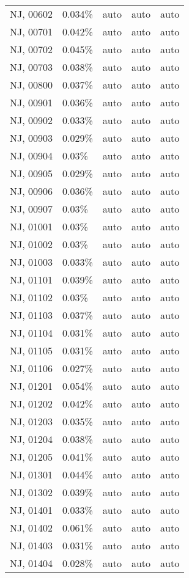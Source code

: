 \begin{longtable}[]{@{}lllll@{}}
NJ, 00602 & 0.034\% & auto & auto & auto \\
NJ, 00701 & 0.042\% & auto & auto & auto \\
NJ, 00702 & 0.045\% & auto & auto & auto \\
NJ, 00703 & 0.038\% & auto & auto & auto \\
NJ, 00800 & 0.037\% & auto & auto & auto \\
NJ, 00901 & 0.036\% & auto & auto & auto \\
NJ, 00902 & 0.033\% & auto & auto & auto \\
NJ, 00903 & 0.029\% & auto & auto & auto \\
NJ, 00904 & 0.03\% & auto & auto & auto \\
NJ, 00905 & 0.029\% & auto & auto & auto \\
NJ, 00906 & 0.036\% & auto & auto & auto \\
NJ, 00907 & 0.03\% & auto & auto & auto \\
NJ, 01001 & 0.03\% & auto & auto & auto \\
NJ, 01002 & 0.03\% & auto & auto & auto \\
NJ, 01003 & 0.033\% & auto & auto & auto \\
NJ, 01101 & 0.039\% & auto & auto & auto \\
NJ, 01102 & 0.03\% & auto & auto & auto \\
NJ, 01103 & 0.037\% & auto & auto & auto \\
NJ, 01104 & 0.031\% & auto & auto & auto \\
NJ, 01105 & 0.031\% & auto & auto & auto \\
NJ, 01106 & 0.027\% & auto & auto & auto \\
NJ, 01201 & 0.054\% & auto & auto & auto \\
NJ, 01202 & 0.042\% & auto & auto & auto \\
NJ, 01203 & 0.035\% & auto & auto & auto \\
NJ, 01204 & 0.038\% & auto & auto & auto \\
NJ, 01205 & 0.041\% & auto & auto & auto \\
NJ, 01301 & 0.044\% & auto & auto & auto \\
NJ, 01302 & 0.039\% & auto & auto & auto \\
NJ, 01401 & 0.033\% & auto & auto & auto \\
NJ, 01402 & 0.061\% & auto & auto & auto \\
NJ, 01403 & 0.031\% & auto & auto & auto \\
NJ, 01404 & 0.028\% & auto & auto & auto \\

\end{longtable}
